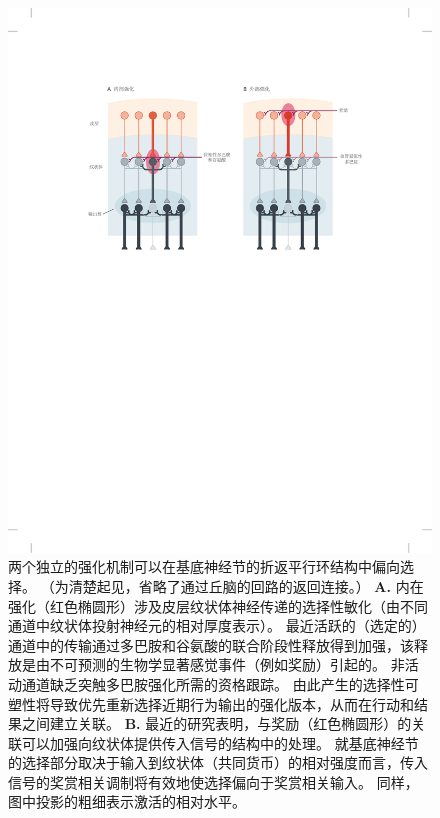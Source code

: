 \begin{figure}[htbp]
	\centering
	\includegraphics[width=1.0\linewidth]{chap38/fig_38_8}
	\caption{两个独立的强化机制可以在基底神经节的折返平行环结构中偏向选择。
		（为清楚起见，省略了通过丘脑的回路的返回连接。）
		\textbf{A.} 内在强化（红色椭圆形）涉及皮层纹状体神经传递的选择性敏化（由不同通道中纹状体投射神经元的相对厚度表示）。
		最近活跃的（选定的）通道中的传输通过多巴胺和谷氨酸的联合阶段性释放得到加强，该释放是由不可预测的生物学显著感觉事件（例如奖励）引起的。
		非活动通道缺乏突触多巴胺强化所需的资格跟踪。
		由此产生的选择性可塑性将导致优先重新选择近期行为输出的强化版本，从而在行动和结果之间建立关联。
		\textbf{B.} 最近的研究表明，与奖励（红色椭圆形）的关联可以加强向纹状体提供传入信号的结构中的处理。
		就基底神经节的选择部分取决于输入到纹状体（共同货币）的相对强度而言，传入信号的奖赏相关调制将有效地使选择偏向于奖赏相关输入。
		同样，图中投影的粗细表示激活的相对水平。}
	\label{fig:38_8}
\end{figure}



